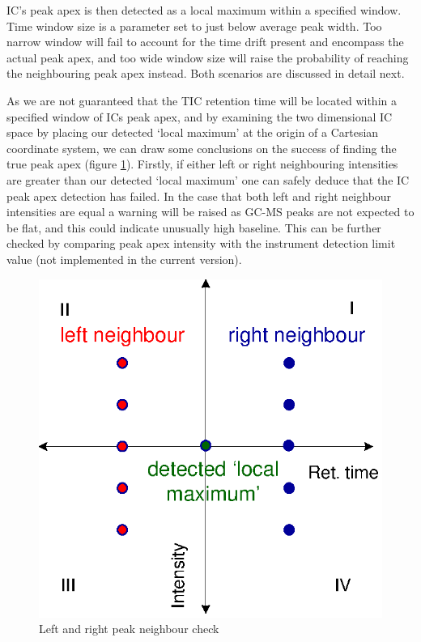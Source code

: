 IC’s peak apex is then detected as a local maximum within a specified window. 
Time window size is a parameter set to just below average peak width. Too narrow 
window will fail to account for the time drift present and encompass the actual 
peak apex, and too wide window size will raise the probability of reaching the 
neighbouring peak apex instead. Both scenarios are discussed in detail next. 

As we are not guaranteed that the TIC retention time will be located within a 
specified window of ICs peak apex, and by examining the two dimensional IC 
space by placing our detected ‘local maximum’ at the origin of a Cartesian 
coordinate system, we can draw some conclusions on the success of finding the 
true peak apex (figure \ref{fig:84}). Firstly, if either left or right
neighbouring intensities are greater than our detected ‘local maximum’ one
can safely deduce that the IC peak apex detection has failed. In the case
that both left and right neighbour intensities are equal a warning will
be raised as GC-MS peaks are not expected to be flat, and this could indicate
unusually high baseline. This can be further checked by comparing peak apex
intensity with the instrument detection limit value (not implemented in the
current version).

\begin{figure}
  \begin{center}
    \includegraphics[scale=0.7]{graphics/chapter08/84.eps}
  \end{center}
  \caption{Left and right peak neighbour check}
  \label{fig:84}
\end{figure}

